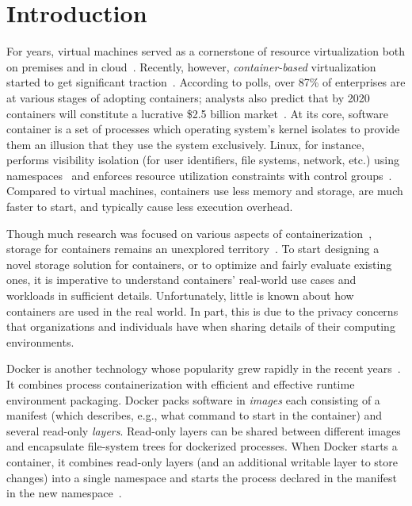 \section{Introduction}

For years, virtual machines served as a cornerstone of resource virtualization
both on premises and in cloud~\cite{rosenblum2005virtual}.
%
Recently, however, \emph{container-based} virtualization started to get
significant traction~\cite{process-containers-linux}.
%
According to polls, over 87\% of enterprises are at various stages of adopting
containers; analysts also predict that by 2020 containers will constitute a
lucrative \$2.5 billion market~\cite{container-grow-by2020}.
%
At its core, software container is a set of processes which operating system's
kernel isolates to provide them an illusion that they
use the system exclusively.
%
Linux, for instance, performs visibility isolation (for user identifiers, file systems,
network, etc.) using namespaces~\cite{man-namespaces} and enforces resource
utilization constraints with control groups~\cite{kernel-doc-cgroups}.
%
Compared to virtual machines, containers use less memory and storage, are much
faster to start, and typically cause less execution overhead.



Though much research was focused on various aspects of
containerization~, storage for containers remains an unexplored
territory~\cite{login-container-storage-options}.
%
To start designing a novel storage solution for containers,
or to optimize and fairly evaluate existing ones,
it is imperative to understand containers' real-world
use cases and workloads in sufficient details.
%
Unfortunately, little is known about how containers are used in the real world.
%
In part, this is due to the privacy concerns that organizations and individuals
have when sharing details of their computing environments.



Docker is another technology whose popularity grew rapidly in the recent
years~\cite{docker}.
%
It combines process containerization with efficient and effective runtime
environment packaging.
%
Docker packs software in \emph{images} each consisting of a manifest (which
describes, e.g., what command to start in the container) and several read-only
\emph{layers}.
%
Read-only layers can be shared between different images and encapsulate file-system
trees for dockerized processes.
%
When Docker starts a container, it combines read-only layers (and an additional
writable layer to store changes) into a single namespace and starts the process
declared in the manifest in the new namespace~\cite{docker-driver-eval}.



